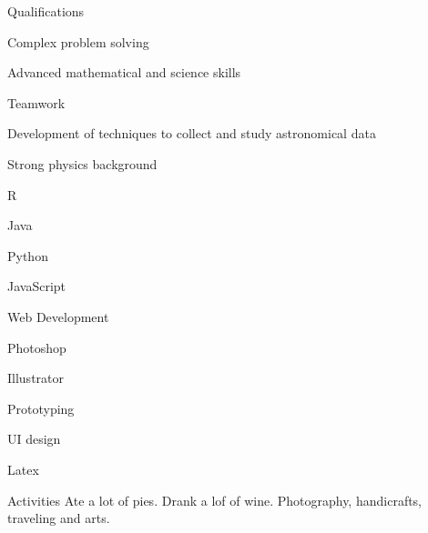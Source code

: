 \documentclass[11pt,final,a4paper]{que_cv}
\begin{document}
%
\begin{cvsection}{Qualifications}
  \begin{entrylist}
  \item Complex problem solving
  \item Advanced mathematical and science skills
  \item Teamwork
  \item Development of techniques to collect and study astronomical data
  \item Strong physics background
  \end{entrylist}
  \begin{hentrylist}
  \item R
  \item Java
  \item Python
  \item JavaScript
  \item Web Development
  \end{hentrylist}
  \begin{hentrylist}
  \item Photoshop
  \item Illustrator
  \item Prototyping
  \item UI design
  \item Latex
  \end{hentrylist}

\end{cvsection}
%
\begin{cvsection}{Activities}
  Ate a lot of pies.
  Drank a lof of wine.
  Photography, handicrafts, traveling and arts.
\end{cvsection}
%
\end{document}
